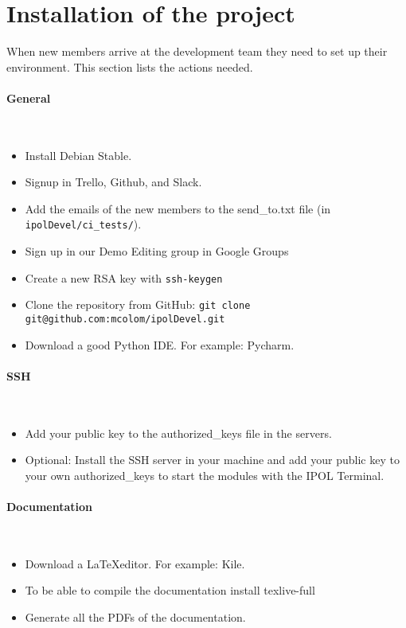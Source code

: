 \section{Installation of the project}
When new members arrive at the development team they need to set up their environment. This section lists the actions needed.

\paragraph{General} \hspace{0pt} \\
\begin{itemize}
    \item Install Debian Stable.
    \item Signup in Trello, Github, and Slack.
    \item Add the emails of the new members to the send\_to.txt file (in {\tt ipolDevel/ci\_tests/}).
    \item Sign up in our Demo Editing group in Google Groups
    \item Create a new RSA key with {\tt ssh-keygen}
    \item Clone the repository from GitHub: {\tt git clone git@github.com:mcolom/ipolDevel.git}
    \item Download a good Python IDE. For example: Pycharm.
\end{itemize}

\paragraph{SSH} \hspace{0pt} \\
\begin{itemize}
    \item Add your public key to the authorized\_keys file in the servers.
    \item Optional: Install the SSH server in your machine and add your public key to your own authorized\_keys to start the modules with the IPOL Terminal.
\end{itemize}

\paragraph{Documentation} \hspace{0pt} \\
\begin{itemize}
    \item Download a \LaTeX editor. For example: Kile.
    \item To be able to compile the documentation install texlive-full
    \item Generate all the PDFs of the documentation.
\end{itemize}

